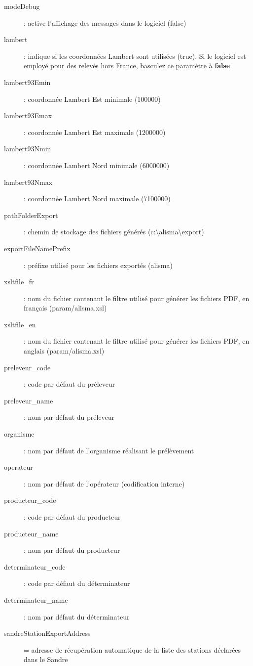 \begin{description}
\item [modeDebug] : active l'affichage des messages dans le logiciel (false)
\item [lambert] : indique si les coordonnées Lambert sont utilisées (true). Si le logiciel est employé pour des relevés hors France, basculez ce paramètre à \textbf{false}
\item [lambert93Emin] : coordonnée Lambert Est minimale (100000)
\item [lambert93Emax] : coordonnée Lambert Est maximale (1200000)
\item [lambert93Nmin] : coordonnée Lambert Nord minimale (6000000)
\item [lambert93Nmax] : coordonnée Lambert Nord maximale (7100000)
\item [pathFolderExport] : chemin de stockage des fichiers générés (\NoAutoSpaceBeforeFDP c:\textbackslash{}alisma\textbackslash{}export)
\item [exportFileNamePrefix] : préfixe utilisé pour les fichiers exportés (alisma)
\item [xsltfile\_fr] : nom du fichier contenant le filtre utilisé pour générer les fichiers PDF, en français (param/alisma.xsl)
\item [xsltfile\_en] : nom du fichier contenant le filtre utilisé pour générer les fichiers PDF, en anglais (param/alisma.xsl)
\item [preleveur\_code] : code par défaut du préleveur
\item [preleveur\_name] : nom par défaut du préleveur
\item [organisme] : nom par défaut de l'organisme réalisant le prélèvement
\item [operateur] : nom par défaut de l'opérateur (codification interne)
\item [producteur\_code] : code par défaut du producteur
\item [producteur\_name] : nom par défaut du producteur
\item [determinateur\_code] : code par défaut du déterminateur
\item [determinateur\_name] : nom par défaut du déterminateur
\item [sandreStationExportAddress] = adresse de récupération automatique de la liste des stations déclarées dans le Sandre

\end{description}


